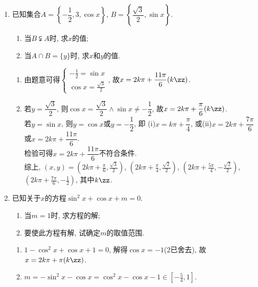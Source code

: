\begin{enumerate}
\item 已知集合$A=\left\{-\dfrac{1}{2},3,\cos{x}\right\}$, $B=\left\{\dfrac{\sqrt{3}}{2},\sin{x}\right\}$. 
\begin{enumerate}[(1)]
\item 当$B\subsetneqq A$时, 求$x$的值;
\item 当$A\cap B=\{y\}$时, 求$x$和$y$的值. 
\end{enumerate}
\begin{jieda}
\begin{enumerate}[(1)]
\item 由题意可得$\begin{cases}
-\frac{1}{2}=\sin{x}\\
\cos{x}=\frac{\sqrt{3}}{2}
\end{cases}$, 故$x=2k\pi+\dfrac{11\pi}{6}(k\zz)$. 

\item 若$y=\dfrac{\sqrt{3}}{2}$, 则$\cos{x}=\dfrac{\sqrt{3}}{2}\land\sin{x}\neq-\dfrac{1}{2}$, 故$x=2k\pi+\dfrac{\pi}{6}(k\zz)$. \\
若$y=\sin{x}$, 则$y=\cos{x}$或$y=-\dfrac{1}{2}$, 即 (i)$x=k\pi+\dfrac{\pi}{4}$, 或(ii)$x=2k\pi+\dfrac{7\pi}{6}$或$x=2k\pi+\dfrac{11\pi}{6}$. \\
检验可得$x=2k\pi+\dfrac{11\pi}{6}$不符合条件. \\
综上, $(x,y)=(2k\pi+\frac{\pi}{6},\frac{\sqrt{3}}{2})$, $(2k\pi+\frac{\pi}{4},\frac{\sqrt{2}}{2})$, 
$(2k\pi+\frac{5\pi}{4},-\frac{\sqrt{2}}{2})$, $(2k\pi+\frac{7\pi}{6},-\frac{1}{2})$, 其中$k\zz$. 
\end{enumerate}
\end{jieda}

\item 已知关于$x$的方程$\sin^2x+\cos{x}+m=0$. 
\begin{enumerate}
\item 当$m=1$时, 求方程的解; 
\item 要使此方程有解, 试确定$m$的取值范围. 
\end{enumerate}
\begin{jieda}
\begin{enumerate}[(1)]
\item $1-\cos^2x+\cos{x}+1=0$, 解得$\cos{x}=-1$(2已舍去), 故$x=2k\pi+\pi(k\zz)$. 

\item $m=-\sin^2x-\cos{x}=\cos^2x-\cos{x}-1\in[-\frac{5}{4},1]$. 
\end{enumerate}
\end{jieda}



\end{enumerate}
